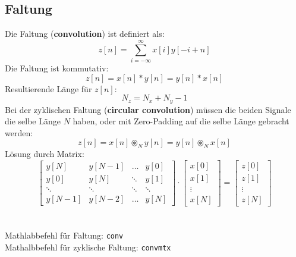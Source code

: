 \subsection{Faltung}
Die Faltung (\textbf{convolution}) ist definiert als:
\[ z[n] = \sum_{i=-\infty}^{\infty} x[i]y[-i+n] \]
Die Faltung ist kommutativ:
\[ z[n] = x[n] * y[n] = y[n] * x[n] \]
Resultierende Länge für $z[n]$:
\[ N_z = N_x + N_y -1 \]
Bei der zyklischen Faltung (\textbf{circular convolution}) müssen die beiden
Signale die selbe Länge $N$ haben, oder mit Zero-Padding auf die selbe Länge
gebracht werden:
\[ z[n] = x[n] \circledast_N y[n] = y[n] \circledast_N x[n] \]
Lösung durch Matrix:
\[
	\begin{bmatrix}
		y[N]	& y[N-1]	& \ldots & y[0] \\
		y[0]	& y[N]		& \ddots & y[1] \\
		\ddots	& \ddots	& \ddots & \ddots \\
		y[N-1]	& y[N-2]	& \ldots & y[N]
	\end{bmatrix} \cdot \begin{bmatrix}
		x[0] \\ x[1] \\ \vdots \\ x[N]
	\end{bmatrix} = \begin{bmatrix}
		z[0] \\ z[1] \\ \vdots \\ z[N]
	\end{bmatrix}
\]
~\\\\
Mathlabbefehl für Faltung: \verb|conv|\\
Mathalbbefehl für zyklische Faltung: \verb|convmtx|